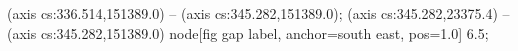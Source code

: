  (axis cs:336.514,151389.0) -- (axis cs:345.282,151389.0);
 (axis cs:345.282,23375.4) -- (axis cs:345.282,151389.0)
  node[fig gap label, anchor=south east, pos=1.0] {\texttimes{}6.5};
